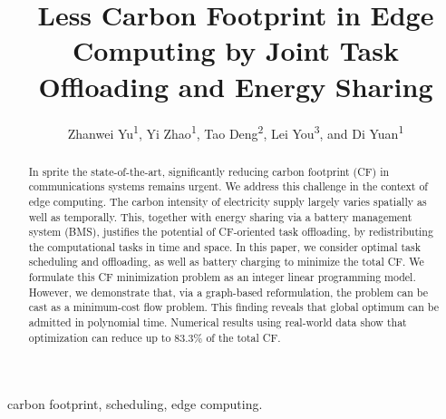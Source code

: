 \documentclass[conference, 10pt, ﬁnal, letterpaper, twocolumn]{IEEEtran}
\begin{document}
\title{Less Carbon Footprint in Edge Computing by Joint Task Offloading and Energy Sharing}

 
\author{Zhanwei Yu\textsuperscript{1}, Yi Zhao\textsuperscript{1}, Tao Deng\textsuperscript{2}, Lei You\textsuperscript{3}, and Di Yuan\textsuperscript{1}}

\renewcommand*{\Affilfont}{\small}

\maketitle


\begin{abstract}
In sprite the state-of-the-art, significantly reducing carbon footprint (CF) in communications systems remains urgent. We address this challenge in the context of edge computing. The carbon intensity of electricity supply largely varies spatially as well as temporally. This, together with energy sharing via a battery management system (BMS), justifies the potential of CF-oriented task offloading, by redistributing the computational tasks in time and space. In this paper, we consider optimal task scheduling and offloading, as well as battery charging to minimize the total CF. We formulate this CF minimization problem as an integer linear programming model. However, we demonstrate that, via a graph-based reformulation, the problem can be cast as a minimum-cost flow problem. This finding reveals that global optimum can be admitted in polynomial time. Numerical results using real-world data show that optimization can reduce up to $83.3\%$ of the total CF.
\end{abstract}

\begin{IEEEkeywords}
carbon footprint, scheduling, edge computing.
\end{IEEEkeywords}
\end{document}
